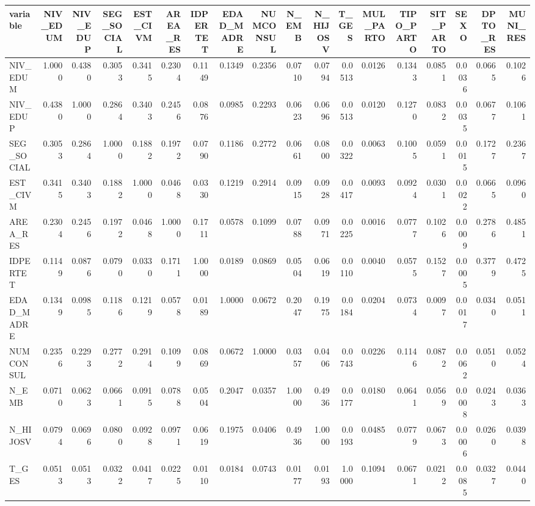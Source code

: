 \begin{tabular}{lrrrrrrrrrrrrrrrrr}
\toprule
variable & NIV\_EDUM & NIV\_EDUP & SEG\_SOCIAL & EST\_CIVM & AREA\_RES & IDPERTET & EDAD\_MADRE & NUMCONSUL & N\_EMB & N\_HIJOSV & T\_GES & MUL\_PARTO & TIPO\_PARTO & SIT\_PARTO & SEXO & DPTO\_RES & MUNI\_RES \\
\midrule
NIV\_EDUM & 1.0000 & 0.4380 & 0.3053 & 0.3415 & 0.2304 & 0.1149 & 0.1349 & 0.2356 & 0.0710 & 0.0794 & 0.0513 & 0.0126 & 0.1343 & 0.0851 & 0.0036 & 0.0665 & 0.1026 \\
NIV\_EDUP & 0.4380 & 1.0000 & 0.2864 & 0.3403 & 0.2456 & 0.0876 & 0.0985 & 0.2293 & 0.0623 & 0.0696 & 0.0513 & 0.0120 & 0.1270 & 0.0832 & 0.0035 & 0.0677 & 0.1061 \\
SEG\_SOCIAL & 0.3053 & 0.2864 & 1.0000 & 0.1882 & 0.1972 & 0.0790 & 0.1186 & 0.2772 & 0.0661 & 0.0800 & 0.0322 & 0.0063 & 0.1005 & 0.0591 & 0.0015 & 0.1727 & 0.2367 \\
EST\_CIVM & 0.3415 & 0.3403 & 0.1882 & 1.0000 & 0.0468 & 0.0330 & 0.1219 & 0.2914 & 0.0915 & 0.0928 & 0.0417 & 0.0093 & 0.0924 & 0.0301 & 0.0022 & 0.0665 & 0.0960 \\
AREA\_RES & 0.2304 & 0.2456 & 0.1972 & 0.0468 & 1.0000 & 0.1711 & 0.0578 & 0.1099 & 0.0788 & 0.0971 & 0.0225 & 0.0016 & 0.0777 & 0.1026 & 0.0009 & 0.2786 & 0.4851 \\
IDPERTET & 0.1149 & 0.0876 & 0.0790 & 0.0330 & 0.1711 & 1.0000 & 0.0189 & 0.0869 & 0.0504 & 0.0619 & 0.0110 & 0.0040 & 0.0575 & 0.1527 & 0.0005 & 0.3779 & 0.4725 \\
EDAD\_MADRE & 0.1349 & 0.0985 & 0.1186 & 0.1219 & 0.0578 & 0.0189 & 1.0000 & 0.0672 & 0.2047 & 0.1975 & 0.0184 & 0.0204 & 0.0734 & 0.0097 & 0.0017 & 0.0340 & 0.0511 \\
NUMCONSUL & 0.2356 & 0.2293 & 0.2772 & 0.2914 & 0.1099 & 0.0869 & 0.0672 & 1.0000 & 0.0357 & 0.0406 & 0.0743 & 0.0226 & 0.1146 & 0.0872 & 0.0062 & 0.0510 & 0.0524 \\
N\_EMB & 0.0710 & 0.0623 & 0.0661 & 0.0915 & 0.0788 & 0.0504 & 0.2047 & 0.0357 & 1.0000 & 0.4936 & 0.0177 & 0.0180 & 0.0641 & 0.0569 & 0.0008 & 0.0243 & 0.0363 \\
N\_HIJOSV & 0.0794 & 0.0696 & 0.0800 & 0.0928 & 0.0971 & 0.0619 & 0.1975 & 0.0406 & 0.4936 & 1.0000 & 0.0193 & 0.0485 & 0.0779 & 0.0673 & 0.0006 & 0.0260 & 0.0398 \\
T\_GES & 0.0513 & 0.0513 & 0.0322 & 0.0417 & 0.0225 & 0.0110 & 0.0184 & 0.0743 & 0.0177 & 0.0193 & 1.0000 & 0.1094 & 0.0671 & 0.0212 & 0.0085 & 0.0327 & 0.0440 \\

\end{tabular}
